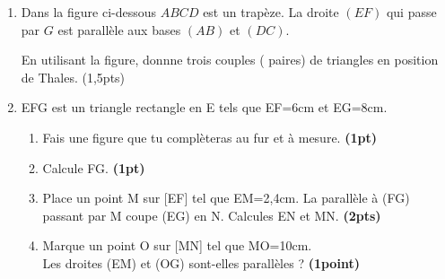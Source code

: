 \documentclass[12pt,a4paper]{article}
\begin{document}
\begin{enumerate}
\item Dans la figure ci-dessous $ABCD$ est un trapèze. La droite $(EF)$ qui passe par $G$ est parallèle aux bases $(AB)$ et $(DC)$.
\begin{center}
\end{center}

En utilisant la figure, donnne trois couples ( paires) de triangles en position de Thales. \quad (1,5pts)

\item EFG est un triangle rectangle en E tels que EF=6cm et EG=8cm.

\begin{enumerate}
\item Fais une figure que tu complèteras au fur et à mesure. \hspace{3cm} \textbf{(1pt)}\\
\item Calcule FG. \hspace{8.8cm} \textbf{(1pt)}\\
\item Place un point M sur [EF] tel que EM=2,4cm. La parallèle à (FG) passant par M coupe (EG) en N. Calcules EN et MN. \hspace{2.5cm} \textbf{(2pts)}\\
\item Marque un point O sur [MN] tel que MO=10cm.\\
Les droites (EM) et (OG) sont-elles parallèles ? \hspace{3.2cm} \textbf{(1point)}
\end{enumerate}
\end{enumerate}
\end{document}
